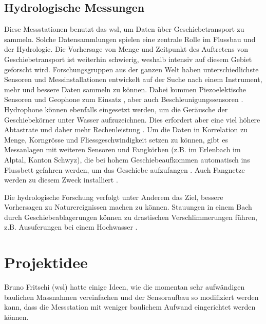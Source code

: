 \subsection{Hydrologische Messungen}
Diese Messstationen benutzt das \gls{wsl}, um Daten über Geschiebetransport zu sammeln. Solche Datensammlungen spielen eine zentrale Rolle im Flussbau und der \gls{Hydrologie}. Die Vorhersage von Menge und Zeitpunkt des Auftretens von Geschiebetransport ist weiterhin schwierig, weshalb intensiv auf diesem Gebiet geforscht wird. Forschungsgruppen aus der ganzen Welt haben unterschiedlichste Sensoren und Messinstallationen entwickelt auf der Suche nach einem Instrument, mehr und bessere Daten sammeln zu können. Dabei kommen Piezoelektische Sensoren und Geophone zum Einsatz \cite{rickenmann2012ESPL}, aber auch Beschleunigungssensoren \cite{reid2007}. Hydrophone können ebenfalls eingesetzt werden, um die Geräusche der Geschiebekörner unter Wasser aufzuzeichnen. Dies erfordert aber eine viel höhere Abtastrate und daher mehr Rechenleistung \cite{wyss2014}. Um die Daten in Korrelation zu Menge, Korngrösse und Fliessgeschwindigkeit setzen zu können, gibt es Messanlagen mit weiteren Sensoren und Fangkörben (z.B. im Erlenbach im Alptal, Kanton Schwyz), die bei hohem Geschiebeaufkommen automatisch ins Flussbett gefahren werden, um das Geschiebe aufzufangen \cite{rickenmann2014ESPL}. Auch Fangnetze werden zu diesem Zweck installiert \cite{rickenmann2014ESPL}. 

Die hydrologische Forschung verfolgt unter Anderem das Ziel, bessere Vorhersagen zu Naturereignissen machen zu können. Stauungen in einem Bach durch Geschiebeablagerungen können zu drastischen Verschlimmerungen führen, z.B. Ausuferungen bei einem Hochwasser \cite{turowski2008}.

\section{Projektidee}
Bruno Fritschi (\gls{wsl}) hatte einige Ideen, wie die momentan sehr aufwändigen baulichen Massnahmen vereinfachen und der Sensoraufbau so modifiziert werden kann, dass die Messstation mit weniger baulichem Aufwand eingerichtet werden können.

